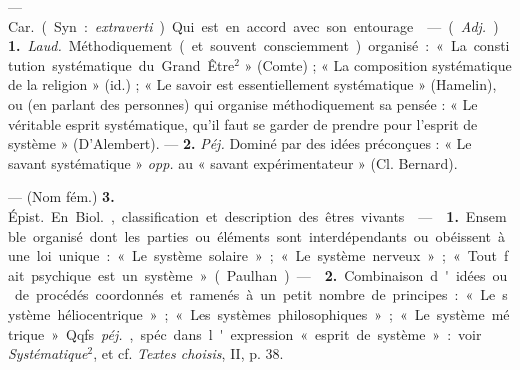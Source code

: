 \begin{itemize}[leftmargin=1cm, label=, itemsep=1pt]
 — \si{Car.} (Syn. : {\it extraverti}). Qui est en accord avec son
entourage.

 — ({\it Adj.}). {\bf 1.} {\it Laud.} Méthodiquement (et
souvent consciemment) organisé : « La constitution systématique du Grand
Être$^2$ » (Comte) ; « La composition systématique de la religion » (id.) ;
« Le savoir est essentiellement systématique » (Hamelin), ou (en parlant des
personnes) qui organise méthodiquement sa pensée : « Le véritable esprit
systématique, qu'il faut se garder de prendre pour l'esprit de système
» (D'Alembert). — {\bf 2.} {\it Péj.} Dominé par des idées préconçues : « Le
savant systématique » {\it opp.} au « savant expérimentateur » (Cl. Bernard).

— (Nom fém.) {\bf 3.} \si{Épist.} En \si{Biol.}, classification et
description des êtres vivants.

 —  {\bf 1.} Ensemble organisé dont les parties
ou éléments sont interdépendants ou obéissent à une loi unique : « Le
système solaire »; « Le système nerveux »; « Tout fait psychique est un
système » (Paulhan). —  {\bf 2.} Combinaison d'idées ou de
procédés coordonnés et ramenés à un petit nombre de principes : « Le système
héliocentrique »; « Les systèmes philosophiques »; « Le système métrique ».
Qqfs. {\it péj.}, spéc. dans l'expression « esprit de système » : voir {\it
Systématique}$^2$, et cf. {\it Textes choisis}, II, p. 38.

	\end{itemize}
